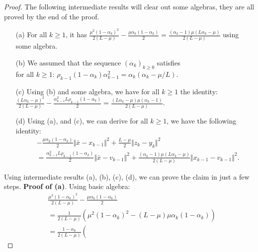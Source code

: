 \documentclass[12pt]{article}
\begin{document}
    \begin{proof}
        The following intermediate results will clear out some algebras, they are all proved by the end of the proof. 
        \begin{enumerate}
            \item [(a)] For all $k \ge 1$, it has $\frac{\mu^2(1 - \alpha_k)^2}{2(L - \mu)} - \frac{\mu\alpha_k(1 - \alpha_k)}{2} = \frac{(\alpha_k - 1)\mu\left(L\alpha_k - \mu\right)}{2\left(L - \mu\right)}$ using some algebra. 
            \item [(b)] We assumed that the sequence $(\alpha_k)_{k \ge 0}$ satisfies\\ for all $k \ge 1$: $\rho_{k - 1}(1 - \alpha_{k})\alpha_{k - 1}^2 = \alpha_{k}(\alpha_{k} - \mu/L)$. 
            \item [(c)] Using (b) and some algebra, we have for all $k \ge 1$ the identity: \\
            $\frac{(L\alpha_k - \mu)^2}{2(L - \mu)} - \frac{\alpha_{k - 1}^2 L \rho_{k - 1}(1 - \alpha_k)}{2} = \frac{(L\alpha_k - \mu)\mu(\alpha_k - 1)}{2(L - \mu)}$. 
            \item [(d)] Using (a), and (c), we can derive for all $k\ge 1$, we have the following identity: 
            \begin{align*}
                & - \frac{\mu\alpha_k(1 - \alpha_k)}{2}\Vert \bar x - x_{k - 1}\Vert^2
                + \frac{L - \mu}{2}\Vert z_k - y_k\Vert^2
                \\ &= 
                \frac{\alpha_{k - 1}^2L \rho_{k - 1}(1 - \alpha_k)}{2}\Vert \bar x - v_{k - 1}\Vert^2
                + \frac{(\alpha_k - 1)\mu(L\alpha_k - \mu)}{2(L - \mu)}\Vert x_{k - 1} - v_{k - 1}\Vert^2. 
            \end{align*}
        \end{enumerate}
        Using intermediate results (a), (b), (c), (d), we can prove the claim in just a few steps. 
        \textbf{Proof of (a)}. 
        Using basic algebra: 
        \begin{align*}
            & \frac{\mu^2(1 - \alpha_k)^2}{2(L - \mu)} 
            - \frac{\mu\alpha_k(1 - \alpha_k)}{2}
            \\
            &= 
            \frac{1}{2\left(L - \mu\right)}
            \left(
                \mu^2(1 - \alpha_k)^2
                - \left(L - \mu\right)\mu \alpha_k(1 - \alpha_k)
            \right)
            \\
            &= \frac{1 - \alpha_k}{2\left(L - \mu\right)}\left(

\end{align*}
\end{proof}
\end{document}
